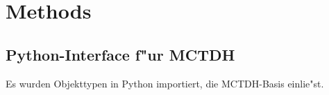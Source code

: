 \chapter{Methods}

\section{Python-Interface f"ur MCTDH}

Es wurden Objekttypen in Python importiert, die MCTDH-Basis einlie"st. 